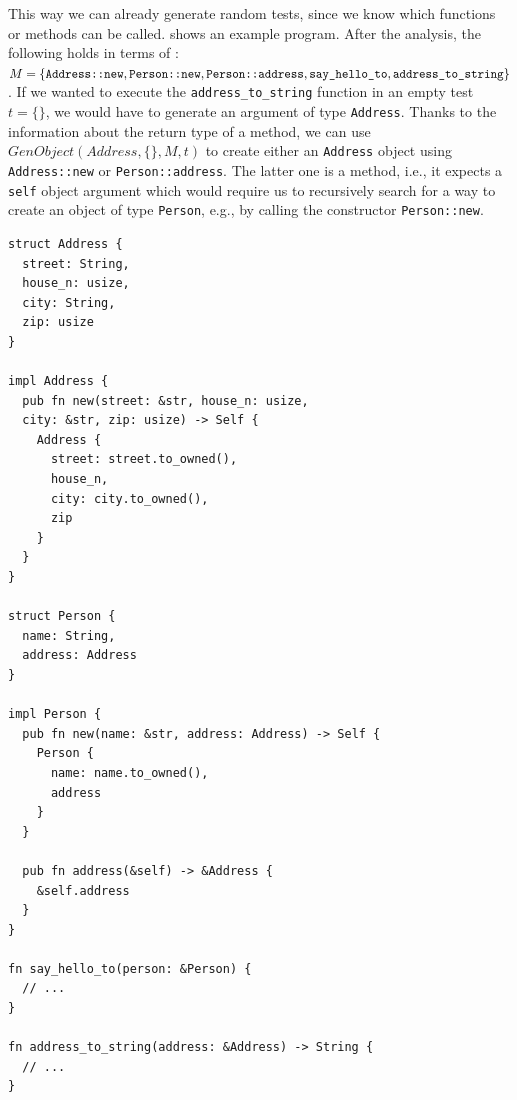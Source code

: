 \documentclass[paper=a4,%
  twoside,%
  BCOR4mm,%
  abstract=true,%
  toc=bibliography,%
  chapterprefix=true,%
  toc=bibliographynumbered,%
  open=right,%
  english,%
  pagesize=pdftex]{scrreprt}
\begin{document}
This way we can already generate random tests, since we know which functions or methods can be called.  shows an example program. After the analysis, the following holds in terms of : $M = \{\texttt{Address::new}, \texttt{Person::new}, \texttt{Person::address}, \texttt{say\string_hello\string_to}, \texttt{address\string_to\string_string}\}$. If we wanted to execute the \texttt{address\string_to\string_string} function in an empty test $t = \{\}$, we would have to generate an argument of type \texttt{Address}. Thanks to the information about the return type of a method, we can use $GenObject(Address, \{\}, M, t)$ to create either an \texttt{Address} object using \texttt{Address::new} or \texttt{Person::address}. The latter one is a method, i.e., it expects a \texttt{self} object argument which would require us to recursively search for a way to create an object of type \texttt{Person}, e.g., by calling the constructor \texttt{Person::new}.

\begin{lstlisting}[style=boxed, caption={After HIR analysis, we know how a \texttt{Person} object can be generated to be used in \texttt{say\string_hello\string_to}.}, label=lst:hir-analysis-example]
struct Address {
  street: String,
  house_n: usize,
  city: String,
  zip: usize
}

impl Address {
  pub fn new(street: &str, house_n: usize,
  city: &str, zip: usize) -> Self {
    Address {
      street: street.to_owned(),
      house_n,
      city: city.to_owned(),
      zip
    }
  }
}

struct Person {
  name: String,
  address: Address
}

impl Person {
  pub fn new(name: &str, address: Address) -> Self {
    Person {
      name: name.to_owned(),
      address
    }
  }

  pub fn address(&self) -> &Address {
    &self.address
  }
}

fn say_hello_to(person: &Person) {
  // ...
}

fn address_to_string(address: &Address) -> String {
  // ...
}
\end{lstlisting}
\end{document}
